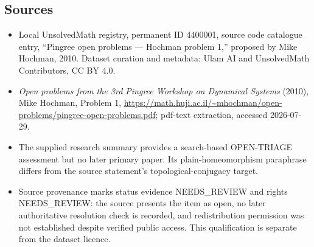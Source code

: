 \documentclass[11pt]{article}
\begin{document}
\subsection{Sources}
\begin{itemize}
\item Local UnsolvedMath registry, permanent ID 4400001, source code catalogue entry, ``Pingree open problems --- Hochman problem 1,'' proposed by Mike Hochman, 2010. Dataset curation and metadata: Ulam AI and UnsolvedMath Contributors, CC BY 4.0.
\item \emph{Open problems from the 3rd Pingree Workshop on Dynamical Systems} (2010), Mike Hochman, Problem 1, \url{https://math.huji.ac.il/~mhochman/open-problems/pingree-open-problems.pdf}; pdf-text extraction, accessed 2026-07-29.
\item The supplied research summary provides a search-based OPEN-TRIAGE assessment but no later primary paper. Its plain-homeomorphism paraphrase differs from the source statement's topological-conjugacy target.
\item Source provenance marks status evidence NEEDS\_REVIEW and rights NEEDS\_REVIEW: the source presents the item as open, no later authoritative resolution check is recorded, and redistribution permission was not established despite verified public access. This qualification is separate from the dataset licence.
\end{itemize}
\end{document}
